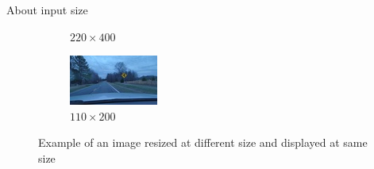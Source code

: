 \documentclass{beamer}
\begin{document}
\begin{frame}{About input size}
\begin{figure}
\begin{center}
\begin{subfigure}[t]{.4\linewidth}
      \caption{$220\times400$}
    \end{subfigure}
    \begin{subfigure}[t]{.4\linewidth}
      \centering
      \includegraphics[width=0.99\linewidth]{figures/im_example_110x200.jpg}
      \caption{$110\times200$}
    \end{subfigure}
    \caption{Example of an image resized at different size and displayed at same size}
    \label{resizeExample}
  \end{center}
\end{figure}
\end{frame}{}
\end{document}
